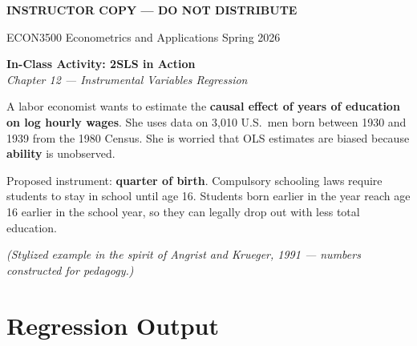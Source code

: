 \documentclass[11pt]{article}
\begin{document}
\thispagestyle{plain}
\singlespacing

\begin{center}
{\color{BrickRed}\textbf{\Large INSTRUCTOR COPY --- DO NOT DISTRIBUTE}}
\end{center}

ECON3500 Econometrics and Applications \hfill Spring 2026

\begin{center}
\Large{\textbf{In-Class Activity: 2SLS in Action}}\\[2pt]
\textit{Chapter 12 --- Instrumental Variables Regression}
\end{center}

\vspace{0.5em}

A labor economist wants to estimate the \textbf{causal effect of years of education on log hourly wages}. She uses data on 3{,}010 U.S.\ men born between 1930 and 1939 from the 1980 Census. She is worried that OLS estimates are biased because \textbf{ability} is unobserved.

Proposed instrument: \textbf{quarter of birth}. Compulsory schooling laws require students to stay in school until age 16. Students born earlier in the year reach age 16 earlier in the school year, so they can legally drop out with less total education.

\textit{(Stylized example in the spirit of Angrist and Krueger, 1991 --- numbers constructed for pedagogy.)}

\section*{Regression Output}
\end{document}
